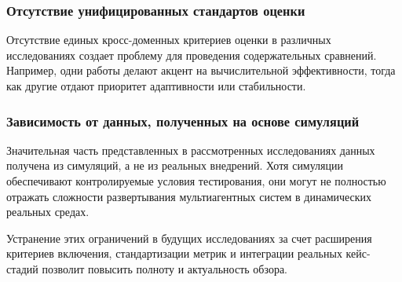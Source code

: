 \subsubsection{Отсутствие унифицированных стандартов оценки}

Отсутствие единых кросс-доменных критериев оценки в различных исследованиях
создает проблему для проведения содержательных сравнений.
Например, одни работы делают акцент на вычислительной эффективности,
тогда как другие отдают приоритет адаптивности или стабильности.

\subsubsection{Зависимость от данных, полученных на основе симуляций}

Значительная часть представленных в рассмотренных исследованиях данных получена из симуляций,
а не из реальных внедрений. Хотя симуляции обеспечивают контролируемые условия тестирования,
они могут не полностью отражать сложности развертывания мультиагентных систем в динамических реальных средах.  

Устранение этих ограничений в будущих исследованиях за счет расширения критериев включения,
стандартизации метрик и интеграции реальных кейс-стадий позволит повысить полноту и актуальность обзора.
